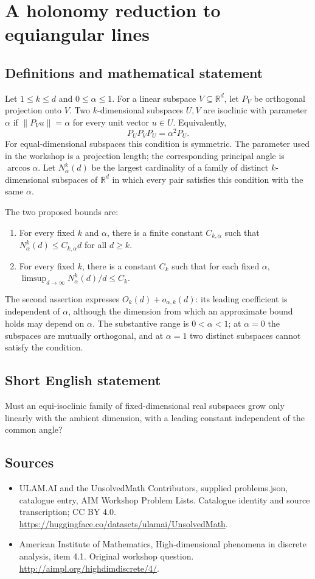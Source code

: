 \documentclass[11pt,a4paper]{article}
\begin{document}
\section*{A holonomy reduction to equiangular lines}\label{statement}

\subsection{Definitions and mathematical statement}
Let $1\le k\le d$ and $0\le\alpha\le1$. For a linear subspace
$V\subseteq\mathbb R^d$, let $P_V$ be orthogonal projection onto $V$.
Two $k$-dimensional subspaces $U,V$ are isoclinic with parameter $\alpha$
if $\|P_Vu\|=\alpha$ for every unit vector $u\in U$. Equivalently,
\[
                P_UP_VP_U=\alpha^2P_U.
\]
For equal-dimensional subspaces this condition is symmetric. The
parameter used in the workshop is a projection length; the corresponding
principal angle is $\arccos\alpha$.
Let $N_\alpha^k(d)$ be the largest cardinality of a family of distinct
$k$-dimensional subspaces of $\mathbb R^d$ in which every pair satisfies
this condition with the same $\alpha$.

The two proposed bounds are:
\begin{enumerate}
\item For every fixed $k$ and $\alpha$, there is a finite constant
$C_{k,\alpha}$ such that $N_\alpha^k(d)\le C_{k,\alpha}d$ for all $d\ge k$.
\item For every fixed $k$, there is a constant $C_k$ such that for each
fixed $\alpha$,
$\limsup_{d\to\infty}N_\alpha^k(d)/d\le C_k$.
\end{enumerate}
The second assertion expresses $O_k(d)+o_{\alpha,k}(d)$: its leading
coefficient is independent of $\alpha$, although the dimension from which
an approximate bound holds may depend on $\alpha$. The substantive range
is $0<\alpha<1$; at $\alpha=0$ the subspaces are mutually orthogonal,
and at $\alpha=1$ two distinct subspaces cannot satisfy the condition.
\subsection{Short English statement}
Must an equi-isoclinic family of fixed-dimensional real subspaces grow only linearly with the ambient dimension, with a leading constant independent of the common angle?
\subsection{Sources}
\begin{itemize}
\item[S1] ULAM.AI and the UnsolvedMath Contributors, supplied problems.json, catalogue entry, AIM Workshop Problem Lists. Catalogue identity and source transcription; CC BY 4.0.
\url{https://huggingface.co/datasets/ulamai/UnsolvedMath}.
\item[S2] American Institute of Mathematics, High-dimensional phenomena in discrete analysis, item 4.1. Original workshop question.
\url{http://aimpl.org/highdimdiscrete/4/}.
\end{itemize}
\end{document}
